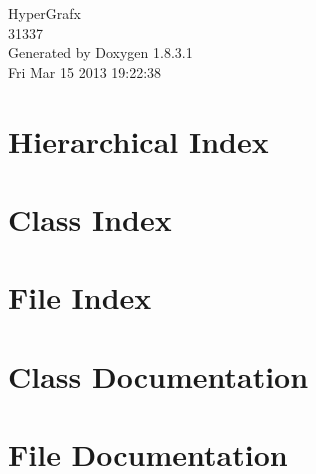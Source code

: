 \documentclass{book}
\begin{document}
\hypersetup{pageanchor=false,citecolor=blue}
\begin{titlepage}
\vspace*{7cm}
\begin{center}
{\Large Hyper\-Grafx \\[1ex]\large 31337 }\\
\vspace*{1cm}
{\large Generated by Doxygen 1.8.3.1}\\
\vspace*{0.5cm}
{\small Fri Mar 15 2013 19:22:38}\\
\end{center}
\end{titlepage}
\clearemptydoublepage
{}
\tableofcontents
\clearemptydoublepage
{}
\hypersetup{pageanchor=true,citecolor=blue}
\chapter{Hierarchical Index}

\chapter{Class Index}

\chapter{File Index}

\chapter{Class Documentation}






















\chapter{File Documentation}
































\printindex
\end{document}
